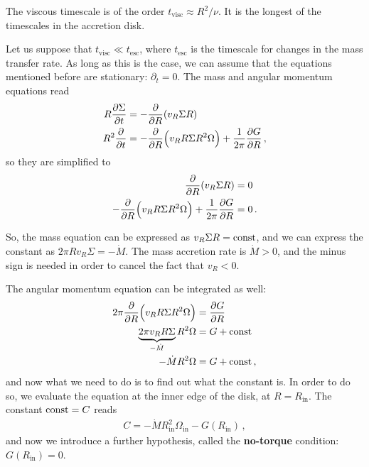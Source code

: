 \documentclass[main.tex]{subfiles}
\begin{document}

The viscous timescale is of the order \(t _{\text{visc}} \approx R^2 / \nu \). 
It is the longest of the timescales in the accretion disk. 

Let us suppose that \(t _{\text{visc}} \ll t _{\text{esc}}\), where \(t _{\text{esc}}\) is the timescale for changes in the mass transfer rate. 
As long as this is the case, we can assume that the equations mentioned before are stationary: \(\partial_{t} = 0\). 
The mass and angular momentum equations read 
%
\begin{align}
R \pdv{\Sigma }{t} &= - \pdv{}{R} \qty(v_R \Sigma R )  \\
R^2 \pdv{}{t} (\Omega \Sigma ) &= - \pdv{}{R} \qty(v_R R \Sigma R^2 \Omega ) + \frac{1}{2 \pi } \pdv{G}{R}
\,,
\end{align}
%
so they are simplified to 
%
\begin{align}
\pdv{}{R} \qty( v_R \Sigma R) &=0  \\
-\pdv{}{R} \qty(v_R R \Sigma R^2 \Omega ) + \frac{1}{2 \pi } \pdv{G}{R}&= 0
\,.
\end{align}

So, the mass equation can be expressed as \(v_R \Sigma R = \text{const}\), and we can express the constant as \(2 \pi R v_R \Sigma = - \dot{M}\). 
The mass accretion rate is \(\dot{M}> 0\), and the minus sign is needed in order to cancel the fact that \(v_R < 0\). 

The angular momentum equation can be integrated as well:
%
\begin{align}
2 \pi 
\pdv{}{R} \qty(v_R R \Sigma R^2 \Omega )
&= \pdv{G}{R} \\
\underbrace{2 \pi v_R R \Sigma}_{-\dot{M}} R^2 \Omega &= G + \text{const}  \\
- \dot{M} R^2 \Omega  &= G + \text{const}
\,,
\end{align}
%
and now what we need to do is to find out what the constant is. In order to do so, we evaluate the equation at the inner edge of the disk, at \(R = R _{\text{in}}\). 
The constant \(\text{const} = C\) reads 
%
\begin{align}
C = - \dot{M} R _{\text{in}}^2 \Omega _{\text{in}} - G(R _{\text{in}})
\,,
\end{align}
%
and now we introduce a further hypothesis, called the \textbf{no-torque} condition: \(G (R _{\text{in}}) = 0\). 
\end{document}
